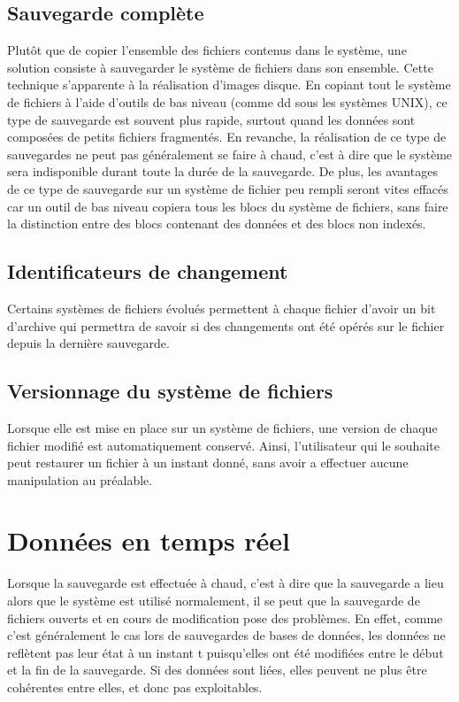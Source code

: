 \documentclass[a4paper,11pt]{report}
\begin{document}
\subsection{Sauvegarde complète}
Plutôt que de copier l'ensemble des fichiers contenus dans le système, une solution consiste à sauvegarder le système de fichiers dans son ensemble.
Cette technique s'apparente à la réalisation d'images disque.
En copiant tout le système de fichiers à l'aide d'outils de bas niveau (comme dd sous les systèmes UNIX), ce type de sauvegarde est souvent plus rapide, surtout quand les données sont composées de petits fichiers fragmentés.
En revanche, la réalisation de ce type de sauvegardes ne peut pas généralement se faire à chaud, c'est à dire que le système sera indisponible durant toute la durée de la sauvegarde.
De plus, les avantages de ce type de sauvegarde sur un système de fichier peu rempli seront vites effacés car un outil de bas niveau copiera tous les blocs du système de fichiers, sans faire la distinction entre des blocs contenant des données et des blocs non indexés.

\subsection{Identificateurs de changement}
Certains systèmes de fichiers évolués permettent à chaque fichier d'avoir un bit d'archive qui permettra de savoir si des changements ont été opérés sur le fichier depuis la dernière sauvegarde.

\subsection{Versionnage du système de fichiers}
Lorsque elle est mise en place sur un système de fichiers, une version de chaque fichier modifié est automatiquement conservé.
Ainsi, l'utilisateur qui le souhaite peut restaurer un fichier à un instant donné, sans avoir a effectuer aucune manipulation au préalable.

\section{Données en temps réel}
Lorsque la sauvegarde est effectuée à chaud, c'est à dire que la sauvegarde a lieu alors que le système est utilisé normalement, il se peut que la sauvegarde de fichiers ouverts et en cours de modification pose des problèmes.
En effet, comme c'est généralement le cas lors de sauvegardes de bases de données, les données ne reflètent pas leur état à un instant t puisqu'elles ont été modifiées entre le début et la fin de la sauvegarde.
Si des données sont liées, elles peuvent ne plus être cohérentes entre elles, et donc pas exploitables.  
\end{document}
